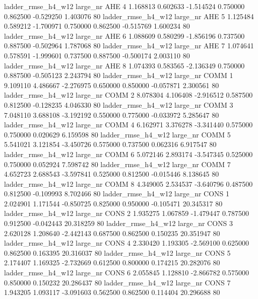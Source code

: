  ladder_rmse_h4_w12   large_nr      AHE                 4  1.168813  0.602633  -1.514524 0.750000 0.862500 -0.529250    1.403076 80
 ladder_rmse_h4_w12   large_nr      AHE                 5  1.125484  0.589212  -1.700971 0.750000 0.862500 -0.515769    1.600234 80
 ladder_rmse_h4_w12   large_nr      AHE                 6  1.088609  0.580299  -1.856196 0.737500 0.887500 -0.502964    1.787068 80
 ladder_rmse_h4_w12   large_nr      AHE                 7  1.074641  0.578591  -1.999601 0.737500 0.887500 -0.500174    2.003110 80
 ladder_rmse_h4_w12   large_nr      AHE                 8  1.074393  0.583565  -2.136349 0.750000 0.887500 -0.505123    2.243794 80
 ladder_rmse_h4_w12   large_nr     COMM                 1  9.109110  4.486667  -2.276975 0.650000 0.850000 -0.057871    2.300561 80
 ladder_rmse_h4_w12   large_nr     COMM                 2  8.078304  4.106408  -2.916512 0.587500 0.812500 -0.128235    4.046330 80
 ladder_rmse_h4_w12   large_nr     COMM                 3  7.048110  3.688108  -3.192192 0.550000 0.775000 -0.033972    5.285647 80
 ladder_rmse_h4_w12   large_nr     COMM                 4  6.162971  3.376278  -3.341440 0.575000 0.750000  0.020629    6.159598 80
 ladder_rmse_h4_w12   large_nr     COMM                 5  5.541021  3.121854  -3.450726 0.575000 0.737500  0.062316    6.917547 80
 ladder_rmse_h4_w12   large_nr     COMM                 6  5.072146  2.893174  -3.547345 0.525000 0.750000  0.052924    7.598742 80
 ladder_rmse_h4_w12   large_nr     COMM                 7  4.652723  2.688543  -3.597841 0.525000 0.812500 -0.015446    8.138645 80
 ladder_rmse_h4_w12   large_nr     COMM                 8  4.349005  2.534537  -3.640796 0.487500 0.812500 -0.109993    8.702466 80
 ladder_rmse_h4_w12   large_nr     CONS                 1  2.024901  1.171544  -0.850725 0.825000 0.950000 -0.105471   20.345317 80
 ladder_rmse_h4_w12   large_nr     CONS                 2  1.935275  1.067859  -1.479447 0.787500 0.912500 -0.042443   20.318259 80
 ladder_rmse_h4_w12   large_nr     CONS                 3  2.620128  1.208640  -2.442143 0.687500 0.862500  0.150235   20.351947 80
 ladder_rmse_h4_w12   large_nr     CONS                 4  2.330420  1.193305  -2.569100 0.625000 0.862500  0.163395   20.316037 80
 ladder_rmse_h4_w12   large_nr     CONS                 5  2.174407  1.169325  -2.732669 0.612500 0.800000  0.174215   20.282076 80
 ladder_rmse_h4_w12   large_nr     CONS                 6  2.055845  1.128810  -2.866782 0.575000 0.850000  0.150232   20.286437 80
 ladder_rmse_h4_w12   large_nr     CONS                 7  1.943205  1.093117  -3.091603 0.562500 0.862500  0.114404   20.296688 80
